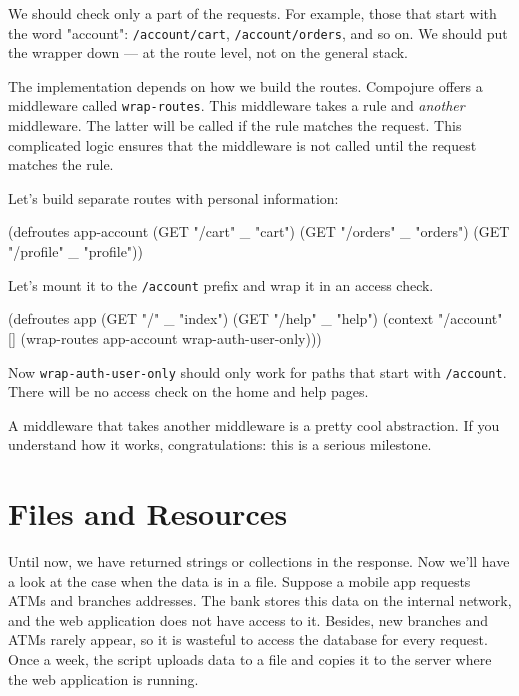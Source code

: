 We should check only a part of the requests. For example, those that start with the word "account": \verb|/account/cart|, \verb|/account/orders|, and so on. We should put the wrapper down — at the route level, not on the general stack.

The implementation depends on how we build the routes. Compojure offers a middleware called \verb|wrap-routes|. This middleware takes a rule and \emph{another} middleware. The latter will be called if the rule matches the request. This complicated logic ensures that the middleware is not called until the request matches the rule.

Let's build separate routes with personal information:

\begin{english}
\begin{clojure}
(defroutes app-account
(GET "/cart"    _ "cart")
(GET "/orders"  _ "orders")
(GET "/profile" _ "profile"))
\end{clojure}
\end{english}

\noindent Let's mount it to the \verb|/account| prefix and wrap it in an access check.

\begin{english}
\begin{clojure}
(defroutes app
(GET "/"     _ "index")
(GET "/help" _ "help")
(context "/account" []
(wrap-routes app-account wrap-auth-user-only)))
\end{clojure}
\end{english}


Now \verb|wrap-auth-user-only| should only work for paths that start with \verb|/account|. There will be no access check on the home and help pages.

A middleware that takes another middleware is a pretty cool abstraction. If you understand how it works, congratulations: this is a serious milestone.

\section{Files and Resources}

\label{http-files}

Until now, we have returned strings or collections in the response. Now we'll have a look at the case when the data is in a file. Suppose a mobile app requests ATMs and branches addresses. The bank stores this data on the internal network, and the web application does not have access to it. Besides, new branches and ATMs rarely appear, so it is wasteful to access the database for every request. Once a week, the script uploads data to a file and copies it to the server where 
the web application is running.

